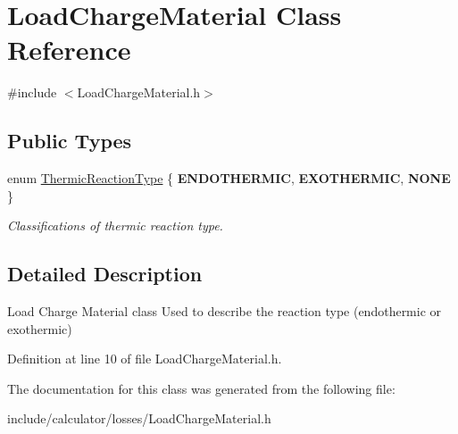 \hypertarget{class_load_charge_material}{}\section{Load\+Charge\+Material Class Reference}
\label{class_load_charge_material}


{\ttfamily \#include $<$Load\+Charge\+Material.\+h$>$}

\subsection*{Public Types}
\begin{DoxyCompactItemize}
\item 
\mbox{\label{class_load_charge_material_a51d4263e865a5d86236622dd3fe23fd1}} 
enum \hyperlink{class_load_charge_material_a51d4263e865a5d86236622dd3fe23fd1}{Thermic\+Reaction\+Type} \{ {\bfseries E\+N\+D\+O\+T\+H\+E\+R\+M\+IC}, 
{\bfseries E\+X\+O\+T\+H\+E\+R\+M\+IC}, 
{\bfseries N\+O\+NE}
 \}\begin{DoxyCompactList}\small\item\em Classifications of thermic reaction type. \end{DoxyCompactList}
\end{DoxyCompactItemize}


\subsection{Detailed Description}
Load Charge Material class Used to describe the reaction type (endothermic or exothermic) 

Definition at line 10 of file Load\+Charge\+Material.\+h.



The documentation for this class was generated from the following file\+:\begin{DoxyCompactItemize}
\item 
include/calculator/losses/Load\+Charge\+Material.\+h\end{DoxyCompactItemize}
